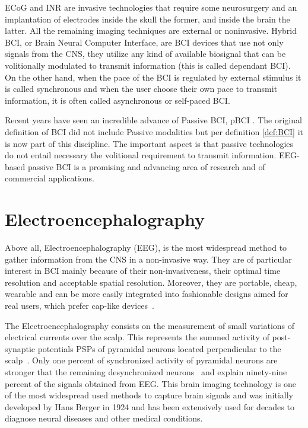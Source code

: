 ECoG and INR are invasive technologies that require some neurosurgery and an implantation of electrodes inside the skull the former, and inside the brain the latter.  All the remaining imaging techniques are external or noninvasive.  Hybrid BCI, or Brain Neural Computer Interface, are BCI devices that use not only signals from the CNS, they utilize any kind of available biosignal that can be volitionally modulated to transmit information (this is called dependant BCI).  On the other hand, when the pace of the BCI is regulated by external stimulus it is called synchronous and when the user choose their own pace to transmit information, it is often called asynchronous or self-paced BCI.

Recent years have seen an incredible advance of Passive BCI, pBCI \cite{Zander2010}.  The original definition of BCI did not include Passive modalities but per definition \ref{def:BCI} it is now part of this discipline.  The important aspect is that passive technologies do not entail necessary the volitional requirement to transmit information.  EEG-based passive BCI is a promising and advancing area of research and of commercial applications.

\section{Electroencephalography}

Above all, Electroencephalography (EEG), is the most widespread method to gather information from the CNS in a non-invasive way. They are of particular interest in BCI mainly because of their non-invasiveness, their optimal time resolution and acceptable spatial resolution. Moreover, they are portable, cheap, wearable and can be more easily integrated into fashionable designs aimed for real users, which prefer cap-like devices~\cite{Huggins2015}. 

The Electroencephalography consists on the measurement of small variations of electrical currents over the scalp.  This represents the summed activity of post-synaptic potentials PSPs of pyramidal neurons located perpendicular to the scalp~\cite{Nam2018}. Only one percent of synchronized activity of pyramidal neurons are stronger that the remaining desynchronized neurons~\cite{Nunez} and explain ninety-nine percent of the signals obtained from EEG.  This brain imaging technology is one of the most widespread used methods to capture brain signals and was initially developed by Hans Berger in 1924 and has been extensively used for decades to diagnose neural diseases and other medical conditions.

